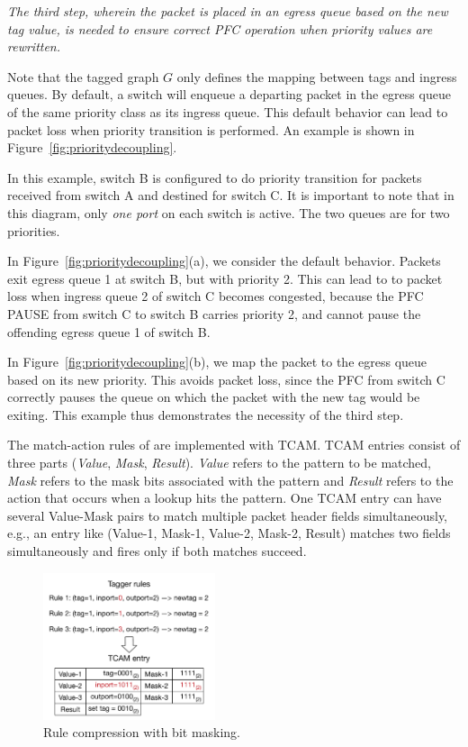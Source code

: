 {\em The third step, wherein the packet is placed in an egress queue based on the
{\em new} tag value, is needed to ensure correct PFC operation when priority
values are rewritten.}

Note that the tagged graph $G$ only defines the mapping between tags and ingress
queues. By default, a switch will enqueue a departing packet in the egress queue
of the same priority class as its ingress queue. This default behavior can lead
to packet loss when priority transition is performed. An example is shown in
Figure~\ref{fig:prioritydecoupling}.

In this example, switch B is configured to do priority transition for packets
received from switch A and destined for switch C. It is important to note that
in this diagram, only {\em one port} on each switch is active. The two queues
are for two priorities.

In Figure~\ref{fig:prioritydecoupling}(a), we consider the default behavior.
Packets exit egress queue 1 at switch B, but with priority 2.  This can lead to
to packet loss when ingress queue 2 of switch C becomes congested, because
the PFC PAUSE from switch C to switch B carries priority 2, and cannot pause
the offending egress queue 1 of switch B.

In Figure~\ref{fig:prioritydecoupling}(b), we map the packet to the egress queue
based on its new priority.  This avoids packet loss, since the PFC from switch C
correctly pauses the queue on which the packet with the new tag would be
exiting. This example thus demonstrates the necessity of the third step.

  The match-action rules of \sysname{}
are implemented with TCAM. TCAM entries consist of three parts ({\em Value},
{\em Mask}, {\em Result}). {\em Value} refers to the pattern to be matched, {\em
Mask} refers to the mask bits associated with the pattern and {\em Result}
refers to the action that occurs when a lookup hits the pattern.  One TCAM entry
can have several Value-Mask pairs to match multiple packet header fields
simultaneously, e.g., an entry like (Value-1, Mask-1, Value-2, Mask-2, Result)
matches two fields simultaneously and fires only if both matches succeed.

\begin{figure}
	\centering
	\includegraphics[width=0.45\textwidth] {figs/compression_with_bitmasking}
	\caption{Rule compression with bit masking.}\label{fig:compression}
    \vspace{-1em}	
\end{figure}

